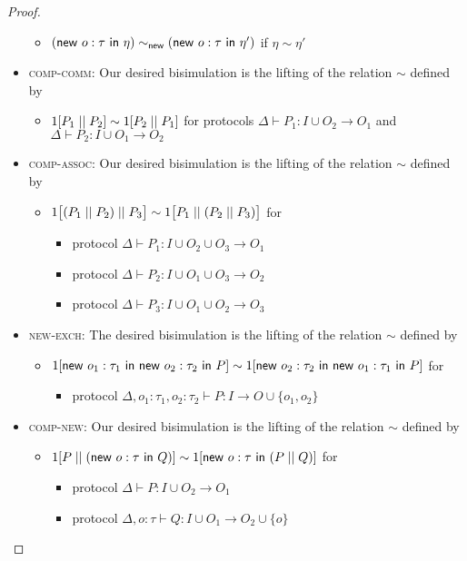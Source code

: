 \begin{proof}
\begin{itemize}
\begin{itemize}
\item $(\mathsf{new} \ o : \tau \ \mathsf{in} \ \eta) \sim_{\mathsf{new}} (\mathsf{new} \ o : \tau \ \mathsf{in} \ \eta')$ if $\eta \sim \eta'$
\end{itemize}
\item \textsc{comp-comm}: Our desired bisimulation is the lifting of the relation $\sim$ defined by
\begin{itemize}
\item $1[P_1 \; || \; P_2] \sim 1[P_2 \; || \; P_1]$ for protocols $\Delta \vdash P_1 : I \cup O_2 \to O_1$ and $\Delta \vdash P_2 : I \cup O_1 \to O_2$
\end{itemize}
\item \textsc{comp-assoc}: Our desired bisimulation is the lifting of the relation $\sim$ defined by
\begin{itemize}
\item $1\big[(P_1 \; || \; P_2) \; || \; P_3\big] \sim 1\big[P_1 \; || \; (P_2 \; || \; P_3)\big]$ for
\begin{itemize}
\item protocol $\Delta \vdash P_1 : I \cup O_2 \cup O_3 \to O_1$
\item protocol $\Delta \vdash P_2 : I \cup O_1 \cup O_3 \to O_2$
\item protocol $\Delta \vdash P_3 : I \cup O_1 \cup O_2 \to O_3$
\end{itemize}
\end{itemize}
\item \textsc{new-exch}: The desired bisimulation is the lifting of the relation $\sim$ defined by
\begin{itemize}
\item $1[\mathsf{new} \ o_1 : \tau_1 \ \mathsf{in} \ \mathsf{new} \ o_2 : \tau_2 \ \mathsf{in} \ P] \sim 1[\mathsf{new} \ o_2 : \tau_2 \ \mathsf{in} \ \mathsf{new} \ o_1 : \tau_1 \ \mathsf{in} \ P]$ for
\begin{itemize}
\item protocol $\Delta, o_1 : \tau_1, o_2 : \tau_2 \vdash P : I \to O \cup \{o_1,o_2\}$
\end{itemize}
\end{itemize}
\item \textsc{comp-new}: Our desired bisimulation is the lifting of the relation $\sim$ defined by
\begin{itemize}
\item $1[P \; || \; (\mathsf{new} \ o : \tau \ \mathsf{in} \ Q)] \sim 1[\mathsf{new} \ o : \tau \ \mathsf{in} \ (P \; || \; Q)]$ for
\begin{itemize}
\item protocol $\Delta \vdash P : I \cup O_2 \to O_1$
\item protocol $\Delta, o : \tau \vdash Q : I \cup O_1 \to O_2 \cup \{o\}$

\end{itemize}
\end{itemize}
\end{itemize}
\end{proof}
